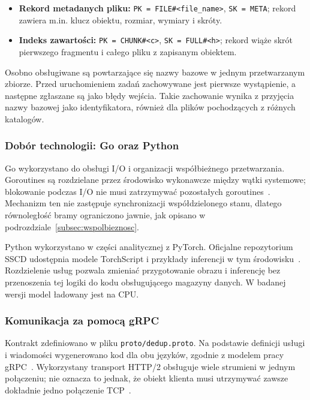 \begin{itemize}
    \item \textbf{Rekord metadanych pliku:}
    \texttt{PK = FILE\#<file\_name>}, \texttt{SK = META};
    rekord zawiera m.in. klucz obiektu, rozmiar, wymiary i skróty.
    \item \textbf{Indeks zawartości:}
    \texttt{PK = CHUNK\#<c>}, \texttt{SK = FULL\#<h>};
    rekord wiąże skrót pierwszego fragmentu i całego pliku
    z zapisanym obiektem.
\end{itemize}

Osobno obsługiwane są powtarzające się nazwy bazowe w jednym
przetwarzanym zbiorze. Przed uruchomieniem zadań zachowywane jest
pierwsze wystąpienie, a następne zgłaszane są jako błędy wejścia.
Takie zachowanie wynika z przyjęcia nazwy bazowej jako identyfikatora,
również dla plików pochodzących z różnych katalogów.

\subsubsection{Dobór technologii: Go oraz Python}

Go wykorzystano do obsługi I/O i organizacji współbieżnego przetwarzania.
Goroutines są rozdzielane przez środowisko wykonawcze między wątki
systemowe; blokowanie podczas I/O nie musi zatrzymywać pozostałych
goroutines~\cite{go_effective}.
Mechanizm ten nie zastępuje synchronizacji współdzielonego stanu,
dlatego równoległość bramy ograniczono jawnie, jak opisano
w podrozdziale~\ref{subsec:wspolbieznosc}.

Python wykorzystano w części analitycznej z PyTorch.
Oficjalne repozytorium SSCD udostępnia modele TorchScript i przykłady
inferencji w tym środowisku~\cite{sscd_repo}.
Rozdzielenie usług pozwala zmieniać przygotowanie obrazu i inferencję
bez przenoszenia tej logiki do kodu obsługującego magazyny danych.
W badanej wersji model ładowany jest na CPU.

\subsubsection{Komunikacja za pomocą gRPC}
\label{subsubsec:grpc-komunikacja}

Kontrakt zdefiniowano w pliku \texttt{proto/dedup.proto}.
Na podstawie definicji usługi i wiadomości wygenerowano kod dla obu
języków, zgodnie z modelem pracy gRPC~\cite{grpc_core_concepts}.
Wykorzystany transport HTTP/2 obsługuje wiele strumieni w jednym
połączeniu; nie oznacza to jednak, że obiekt klienta musi utrzymywać
zawsze dokładnie jedno połączenie TCP~\cite{rfc9113,grpc_go_client}.

